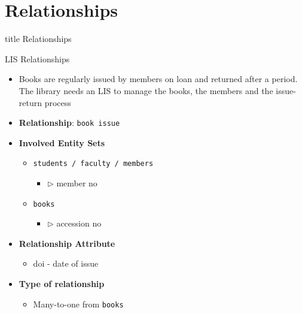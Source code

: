 \documentclass[aspectratio=169, xcolor=dvipsnames]{beamer}
\begin{document}
\section{Relationships}
\begin{frame}
  \vfill
  \centering
  \begin{beamercolorbox}[sep=8pt,center,shadow=true,rounded=true]{title}
    Relationships\par%
  \end{beamercolorbox}
  \vfill
\end{frame}

\begin{frame}{LIS Relationships}
    \begin{itemize}
        \item Books are regularly issued by members on loan and returned after a period. The library needs an LIS to manage the books, the members and the issue-return process
        \item \textbf{Relationship}: \texttt{book issue}
        \item \textbf{Involved Entity Sets}
        \begin{itemize}
            \item \texttt{students / faculty / members}
            \begin{itemize}
                \item $\triangleright$ member no
            \end{itemize}
            \item \texttt{books}
            \begin{itemize}
                \item $\triangleright$ accession no
            \end{itemize}
        \end{itemize}
        \item \textbf{Relationship Attribute}
        \begin{itemize}
            \item doi - date of issue
        \end{itemize}
        \item \textbf{Type of relationship}
        \begin{itemize}
            \item Many-to-one from \texttt{books}
        \end{itemize}
    \end{itemize}
\end{frame}
\end{document}
